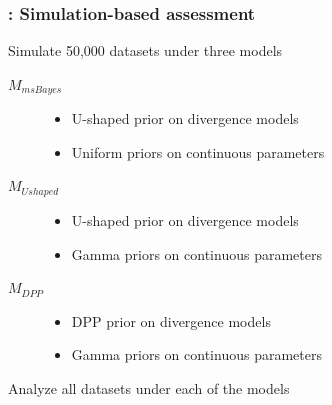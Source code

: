 \begin{frame}
    \frametitle{\dppmsbayes: Simulation-based assessment}
        Simulate 50,000 datasets under three models\\
        \smallskip
        \begin{description}
            \item[$M_{msBayes}$]
                \begin{itemize}
                    \item U-shaped prior on divergence models
                    \item Uniform priors on continuous parameters
                \end{itemize}
            \smallskip
            \item[$M_{Ushaped}$]
                \begin{itemize}
                    \item U-shaped prior on divergence models
                    \item Gamma priors on continuous parameters
                \end{itemize}
            \smallskip
            \item[$M_{DPP}$]
                \begin{itemize}
                    \item DPP prior on divergence models
                    \item Gamma priors on continuous parameters
                \end{itemize}
        \end{description}
        \smallskip
        Analyze all datasets under each of the models
\end{frame}

